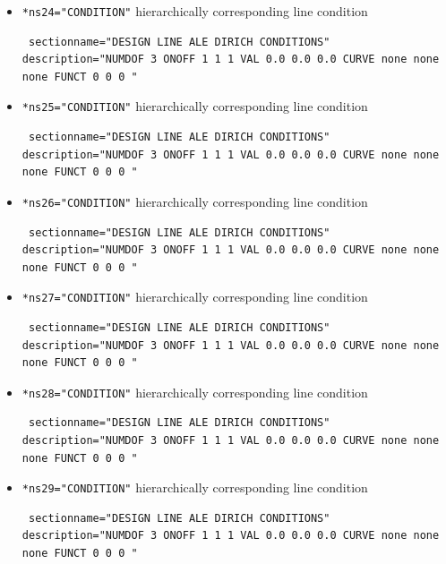 \begin{itemize}
 \item \verb|*ns24="CONDITION"| \qquad hierarchically corresponding line condition
\begin{small} \begin{verbatim} sectionname="DESIGN LINE ALE DIRICH CONDITIONS"
description="NUMDOF 3 ONOFF 1 1 1 VAL 0.0 0.0 0.0 CURVE none none none FUNCT 0 0 0 "
\end{verbatim} \end{small} 

\item \verb|*ns25="CONDITION"| \qquad hierarchically corresponding line condition
\begin{small} \begin{verbatim} sectionname="DESIGN LINE ALE DIRICH CONDITIONS"
description="NUMDOF 3 ONOFF 1 1 1 VAL 0.0 0.0 0.0 CURVE none none none FUNCT 0 0 0 "
\end{verbatim} \end{small}

 \item \verb|*ns26="CONDITION"| \qquad hierarchically corresponding line condition
\begin{small} \begin{verbatim} sectionname="DESIGN LINE ALE DIRICH CONDITIONS"
description="NUMDOF 3 ONOFF 1 1 1 VAL 0.0 0.0 0.0 CURVE none none none FUNCT 0 0 0 "
\end{verbatim} \end{small}

 \item \verb|*ns27="CONDITION"| \qquad hierarchically corresponding line condition
\begin{small} \begin{verbatim} sectionname="DESIGN LINE ALE DIRICH CONDITIONS"
description="NUMDOF 3 ONOFF 1 1 1 VAL 0.0 0.0 0.0 CURVE none none none FUNCT 0 0 0 "
\end{verbatim} \end{small}

 \item \verb|*ns28="CONDITION"| \qquad hierarchically corresponding line condition
\begin{small} \begin{verbatim} sectionname="DESIGN LINE ALE DIRICH CONDITIONS"
description="NUMDOF 3 ONOFF 1 1 1 VAL 0.0 0.0 0.0 CURVE none none none FUNCT 0 0 0 "
\end{verbatim} \end{small}

 \item \verb|*ns29="CONDITION"| \qquad hierarchically corresponding line condition
\begin{small} \begin{verbatim} sectionname="DESIGN LINE ALE DIRICH CONDITIONS"
description="NUMDOF 3 ONOFF 1 1 1 VAL 0.0 0.0 0.0 CURVE none none none FUNCT 0 0 0 "
\end{verbatim} \end{small}


\end{itemize}
